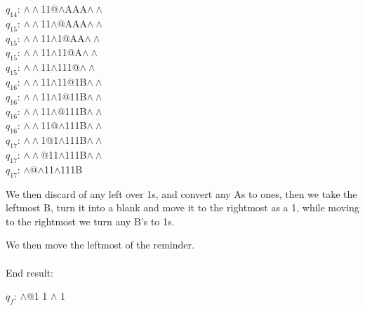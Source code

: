 \documentclass[a4paper]{article} %
\begin{document}
\begin{tasks}[label={(\roman*)},label-width={0.7cm},before-skip = -\parskip , %
            after-skip = -\parskip,
            after-item-skip = -\parskip]
            $q_{14}$: $\land\land$11@$\land$AAA$\land\land$\\
            $q_{15}$: $\land\land$11$\land$@AAA$\land\land$\\ 
            $q_{15}$: $\land\land$11$\land$1@AA$\land\land$\\
            $q_{15}$: $\land\land$11$\land$11@A$\land\land$\\ 
            $q_{15}$: $\land\land$11$\land$111@$\land\land$\\
            $q_{16}$: $\land\land$11$\land$11@1B$\land\land$\\
            $q_{16}$: $\land\land$11$\land$1@11B$\land\land$\\
            $q_{16}$: $\land\land$11$\land$@111B$\land\land$\\
            $q_{16}$: $\land\land$11@$\land$111B$\land\land$\\
            $q_{17}$: $\land\land$1@1$\land$111B$\land\land$\\
            $q_{17}$: $\land\land$@11$\land$111B$\land\land$\\
            $q_{17}$: $\land$@$\land$11$\land$111B

            \task
            We then discard of any left over 1s, and convert any As to ones, then we take the leftmost B, turn it into a blank and move it to the rightmost as a 1, while moving to the rightmost we turn any B's to 1s.

            \task
            We then move the leftmost of the reminder.\\\\End result:

            $q_{f}$: $\land$@1 1 $\land$ 1
        \end{tasks}
\end{document}
